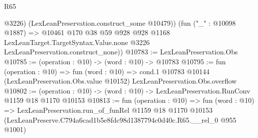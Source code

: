 \begin{lexlean}{R65}
\begin{coremodule}
          @3226)
        (LexLeanPreservation.construct_some @10479))
      (fun ("_" : @10098 @1887) =>
      @10461
        @170
        @38
        @59
        @928
        @928
        @1168
        LexLeanTarget.TargetSyntax.Value.none
        @3226
        LexLeanPreservation.construct_none))
@10783 := LexLeanPreservation.Obs
@10785 := (operation : @10) -> (word : @10) -> @10783
@10795 := fun (operation : @10) =>
  fun (word : @10) =>
  cond.{1} @10783 @10144 (LexLeanPreservation.Obs.value @10152) LexLeanPreservation.Obs.overflow
@10802 := (operation : @10) -> (word : @10) -> LexLeanPreservation.RunConv @1159 @18 @1170 @10153
@10813 := fun (operation : @10) =>
  fun (word : @10) =>
  LexLeanPreservation.run_of_funRel
    @1159
    @18
    @1170
    @10153
    (LexLeanPreserve.C794a6cad1b5e8fdc98d1387794c0d40c.R65.__rel_0 @955 @1001)
\end{coremodule}
\end{lexlean}
